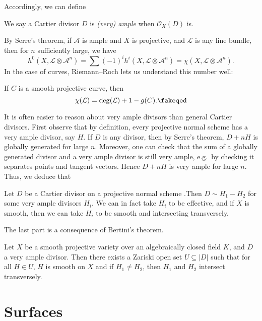 \documentclass[a4paper]{article}
\begin{document}
Accordingly, we can define
\begin{defi}
  We say a Cartier divisor $D$ is \emph{(very) ample} when $\mathcal{O}_X(D)$ is.
\end{defi}
By Serre's theorem, if $\mathcal{A}$ is ample and $X$ is projective, and $\mathcal{L}$ is any line bundle, then for $n$ sufficiently large, we have
\[
  h^0(X, \mathcal{L} \otimes \mathcal{A}^n) = \sum (-1)^i h^i(X, \mathcal{L} \otimes \mathcal{A}^n) = \chi(X, \mathcal{L} \otimes \mathcal{A}^n).
\]
In the case of curves, Riemann--Roch lets us understand this number well:

\begin{thm}
  If $C$ is a smooth projective curve, then
  \[
    \chi(\mathcal{L}) = \deg(\mathcal{L}) + 1 - g(C).\fakeqed
  \]
\end{thm}

It is often easier to reason about very ample divisors than general Cartier divisors. First observe that by definition, every projective normal scheme has a very ample divisor, say $H$. If $D$ is any divisor, then by Serre's theorem, $D + nH$ is globally generated for large $n$. Moreover, one can check that the sum of a globally generated divisor and a very ample divisor is still very ample, e.g.\ by checking it separates points and tangent vectors. Hence $D + nH$ is very ample for large $n$. Thus, we deduce that

\begin{prop}
  Let $D$ be a Cartier divisor on a projective normal scheme .Then $D \sim H_1 - H_2$ for some very ample divisors $H_i$. We can in fact take $H_i$ to be effective, and if $X$ is smooth, then we can take $H_i$ to be smooth and intersecting transversely.\fakeqed
\end{prop}

The last part is a consequence of Bertini's theorem.
\begin{thm}[Bertini]
  Let $X$ be a smooth projective variety over an algebraically closed field $K$, and $D$ a very ample divisor. Then there exists a Zariski open set $U \subseteq |D|$ such that for all $H \in U$, $H$ is smooth on $X$ and if $H_1 \not= H_2$, then $H_1$ and $H_2$ intersect transversely.\fakeqed
\end{thm}

\section{Surfaces}
\end{document}
